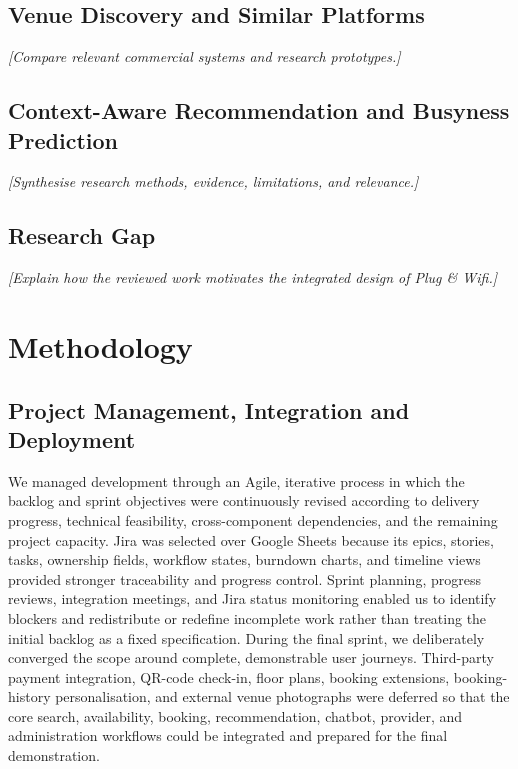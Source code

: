 ﻿\documentclass[conference,a4paper]{IEEEtran}
\newif\ifshowguidance
\newcommand{\guidance}[1]{%
  \ifshowguidance
    \par\smallskip
    \noindent\fcolorbox{gray}{gray!8}{%
      \parbox{\dimexpr\columnwidth-2\fboxsep-2\fboxrule\relax}{%
        \footnotesize\color{gray!75!black}\textbf{Draft guidance:} #1}}
    \par\smallskip
  \fi
}
\begin{document}
\subsection{Venue Discovery and Similar Platforms}
\textit{[Compare relevant commercial systems and research prototypes.]}

\subsection{Context-Aware Recommendation and Busyness Prediction}
\textit{[Synthesise research methods, evidence, limitations, and relevance.]}

\subsection{Research Gap}
\textit{[Explain how the reviewed work motivates the integrated design of
Plug \& Wifi.]}

\section{Methodology}
\label{sec:methodology}
\guidance{Target: 2.10--2.30 pages in total. For each major decision use:
requirement or problem, selected approach, implementation, justification,
and trade-off. Include a compact architecture figure and avoid turning the
section into a feature list.}

\subsection{Project Management, Integration and Deployment}
\label{sec:project-management}

We managed development through an Agile, iterative process in which the
backlog and sprint objectives were continuously revised according to
delivery progress, technical feasibility, cross-component dependencies,
and the remaining project capacity. Jira was selected over Google Sheets
because its epics, stories, tasks, ownership fields, workflow states,
burndown charts, and timeline views provided stronger traceability and
progress control. Sprint planning, progress reviews, integration meetings,
and Jira status monitoring enabled us to identify blockers and redistribute
or redefine incomplete work rather than treating the initial backlog as a
fixed specification. During the final sprint, we deliberately converged
the scope around complete, demonstrable user journeys. Third-party payment
integration, QR-code check-in, floor plans, booking extensions,
booking-history personalisation, and external venue photographs were
deferred so that the core search, availability, booking, recommendation,
chatbot, provider, and administration workflows could be integrated and
prepared for the final demonstration.
\end{document}
